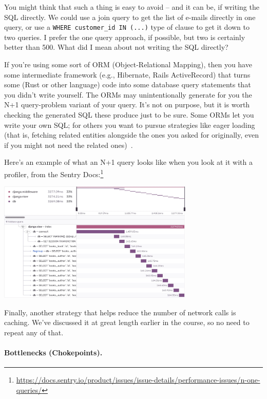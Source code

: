 You might think that such a thing is easy to avoid -- and it can be, if writing the SQL directly. We could use a join query to get the list of e-mails directly in one query, or use a \texttt{WHERE customer\_id IN (...)} type of clause to get it down to two queries. I prefer the one query approach, if possible, but two is certainly better than 500. What did I mean about not writing the SQL directly?

If you're using some sort of ORM (Object-Relational Mapping), then you have some intermediate framework (e.g., Hibernate, Rails ActiveRecord) that turns some (Rust or other language) code into some database query statements that you didn't write yourself. The ORMs may unintentionally generate for you the N+1 query-problem variant of your query. It's not on purpose, but it is worth checking the generated SQL these produce just to be sure. Some ORMs let you write your own SQL; for others you want to pursue strategies like eager loading (that is, fetching related entities alongside the ones you asked for originally, even if you might not need the related ones)~\cite{nplusone}. 

Here's an example of what an N+1 query looks like when you look at it with a profiler, from the Sentry Docs:\footnote{\url{https://docs.sentry.io/product/issues/issue-details/performance-issues/n-one-queries/}}
\begin{center}
  \includegraphics[width=0.7\textwidth]{images/nplusone.png}
\end{center}

Finally, another strategy that helps reduce the number of network calls is caching. We've discussed it at great length earlier in the course, so no need to repeat any of that.

\paragraph{Bottlenecks (Chokepoints).} 

